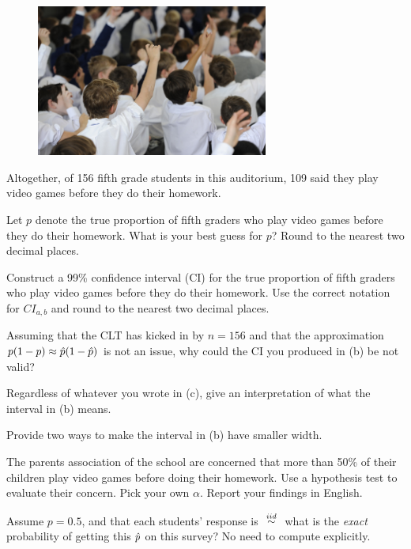 \documentclass[12pt]{article}
\begin{document}
\begin{figure}[h]
\begin{center}
\includegraphics[width=3in]{students.png}
\end{center}
\end{figure}

Altogether, of 156 fifth grade students in this auditorium, 109 said they play video games before they do their homework.


\benum
{} Let $p$ denote the true proportion of fifth graders who play video games before they do their homework. What is your best guess for $p$? Round to the nearest two decimal places. 

 Construct a 99\% confidence interval (CI) for the true proportion of fifth graders who play video games before they do their homework. Use the correct notation for $CI_{a,b}$ and round to the nearest two decimal places. 

 Assuming that the CLT has kicked in by $n=156$ and that the approximation $p(1-p) \approx \hat{p}(1-\hat{p})$ is not an issue, why could the CI you produced in (b) be not valid? 

 Regardless of whatever you wrote in (c), give an interpretation of what the interval in (b) means. 

 Provide two ways to make the interval in (b) have smaller width. 


 The parents association of the school are concerned that more than 50\% of their children play video games before doing their homework. Use a hypothesis test to evaluate their concern. Pick your own $\alpha$. Report your findings in English. 

 Assume $p=0.5$, and that each students' response is $\iid$ what is the \textit{exact} probability of getting this $\hat{p}$ on this survey? No need to compute explicitly. 
\end{document}
